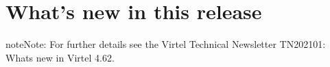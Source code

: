 \documentclass[letterpaper,10pt,english]{sphinxmanual}
\begin{document}
\newpage

\ignorespaces 

\chapter{What’s new in this release}
\label{\detokenize{Migration_Guide:what-s-new-in-this-release}}\label{\detokenize{Migration_Guide:index-9}}
\begin{sphinxadmonition}{note}{Note:}
\sphinxAtStartPar
For further details see the Virtel Technical Newsletter TN202101: Whats new in Virtel 4.62.
\end{sphinxadmonition}



\renewcommand{\indexname}{Index}
\printindex
\end{document}
